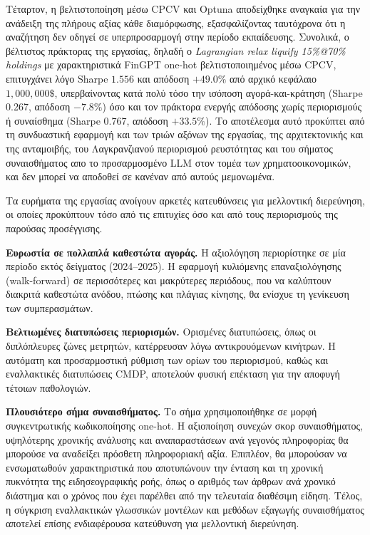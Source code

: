 Τέταρτον, η βελτιστοποίηση μέσω CPCV και Optuna αποδείχθηκε αναγκαία για την ανάδειξη της
πλήρους αξίας κάθε διαμόρφωσης, εξασφαλίζοντας ταυτόχρονα ότι η αναζήτηση δεν οδηγεί σε
υπερπροσαρμογή στην περίοδο εκπαίδευσης. Συνολικά, ο βέλτιστος πράκτορας της εργασίας,
δηλαδή ο \textit{Lagrangian relax liquify 15\%@70\% holdings} με χαρακτηριστικά FinGPT one-hot βελτιστοποιημένος μέσω
CPCV, επιτυγχάνει λόγο Sharpe $1{.}556$ και απόδοση $+49{.}0\%$ από αρχικό κεφάλαιο
$1,000,000\$$, υπερβαίνοντας κατά πολύ τόσο την ισόποση αγορά-και-κράτηση (Sharpe 0.267,
απόδοση $-7{.}8\%$) όσο και τον πράκτορα ενεργής απόδοσης χωρίς περιορισμούς ή συναίσθημα
(Sharpe 0.767, απόδοση $+33{.}5\%$). Το αποτέλεσμα αυτό προκύπτει από τη συνδυαστική εφαρμογή
και των τριών αξόνων της εργασίας, της αρχιτεκτονικής και της ανταμοιβής, του Λαγκρανζιανού
περιορισμού ρευστότητας και του σήματος συναισθήματος απο το προσαρμοσμένο LLM στον τομέα των χρηματοοικονομικών, 
και δεν μπορεί να αποδοθεί σε κανέναν από αυτούς μεμονωμένα.

Τα ευρήματα της εργασίας ανοίγουν αρκετές κατευθύνσεις για μελλοντική διερεύνηση, οι οποίες
προκύπτουν τόσο από τις επιτυχίες όσο και από τους περιορισμούς της παρούσας προσέγγισης.

\textbf{Ευρωστία σε πολλαπλά καθεστώτα αγοράς.} Η αξιολόγηση περιορίστηκε σε μία
περίοδο εκτός δείγματος (2024--2025). Η εφαρμογή κυλιόμενης επαναξιολόγησης (walk-forward)
σε περισσότερες και μακρύτερες περιόδους, που να καλύπτουν διακριτά καθεστώτα ανόδου,
πτώσης και πλάγιας κίνησης, θα ενίσχυε τη γενίκευση των συμπερασμάτων.

\textbf{Βελτιωμένες διατυπώσεις περιορισμών.} Ορισμένες διατυπώσεις, όπως οι
διπλόπλευρες ζώνες μετρητών, κατέρρευσαν λόγω αντικρουόμενων κινήτρων. Η αυτόματη και
προσαρμοστική ρύθμιση των ορίων του περιορισμού, καθώς και εναλλακτικές διατυπώσεις CMDP,
αποτελούν φυσική επέκταση για την αποφυγή τέτοιων παθολογιών.

\textbf{Πλουσιότερο σήμα συναισθήματος.} Το σήμα χρησιμοποιήθηκε σε μορφή συγκεντρωτικής 
κωδικοποίησης one-hot. Η αξιοποίηση συνεχών σκορ συναισθήματος, υψηλότερης χρονικής ανάλυσης και 
αναπαραστάσεων ανά γεγονός πληροφορίας θα μπορούσε να αναδείξει πρόσθετη πληροφοριακή αξία. 
Επιπλέον, θα μπορούσαν να ενσωματωθούν χαρακτηριστικά που αποτυπώνουν την ένταση και τη χρονική 
πυκνότητα της ειδησεογραφικής ροής, όπως ο αριθμός των άρθρων ανά χρονικό διάστημα και ο χρόνος 
που έχει παρέλθει από την τελευταία διαθέσιμη είδηση. Τέλος, η σύγκριση εναλλακτικών γλωσσικών 
μοντέλων και μεθόδων εξαγωγής συναισθήματος αποτελεί επίσης ενδιαφέρουσα κατεύθυνση για μελλοντική διερεύνηση.


